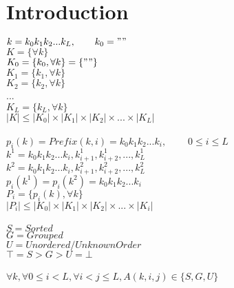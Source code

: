 \documentclass[12pt]{article}
\begin{document}
\maketitle

\section{Introduction}
$k=k_0k_1k_2...k_L,~~~~~~k_0=""$\\
$K=\{\forall k\}$\\
$K_0=\{k_0,\forall k\}=\{""\}$\\
$K_1=\{k_1,\forall k\}$\\
$K_2=\{k_2,\forall k\}$\\
...\\
$K_L=\{k_L,\forall k\}$\\
$|K|\le|K_0|\times|K_1|\times|K_2|\times ... \times|K_L|$\\
\\
$p_i(k)=Prefix(k,i)=k_0k_1k_2...k_i,~~~~~~~~~~0\le i\le L$\\
$k^1=k_0k_1k_2...k_i,k_{i+1}^1,k_{i+2}^1,...,k_L^1$\\
$k^2=k_0k_1k_2...k_i,k_{i+1}^2,k_{i+2}^2,...,k_L^2$\\
$p_i(k^1)=p_i(k^2)=k_0k_1k_2...k_i$\\
$P_i=\{p_i(k), \forall k\}$\\
$|P_i|\le|K_0|\times|K_1|\times|K_2|\times ... \times|K_i|$\\
\\
$S=Sorted$\\
$G=Grouped$\\
$U=Unordered/UnknownOrder$\\
$\top=S>G>U=\bot$\\
\\
$\forall k, \forall 0\le i<L, \forall i<j\le L,A(k,i,j)\in \{S,G,U\}$
\end{document}
